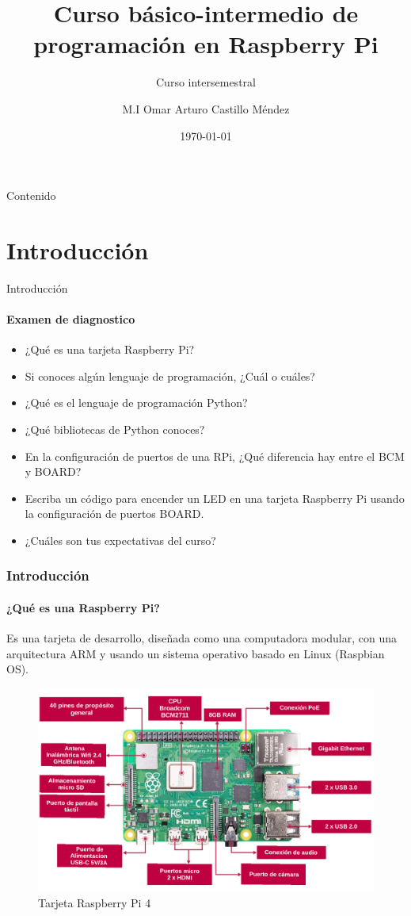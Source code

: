 \documentclass{beamer}
\title{Curso básico-intermedio de programación en Raspberry Pi}
\subtitle{Curso intersemestral}
\date{\today}
\author[OACM]{M.I Omar Arturo Castillo Méndez}
\begin{document}
	
	\begin{frame}[plain]
		\titlepage
	\end{frame}
	
	\begin{frame}{Contenido}
		\tableofcontents
	\end{frame}
	
	\section{Introducción}
	
	\begin{frame}{Introducción}
		\framesubtitle{Examen de diagnostico}
		\begin{itemize}
			\item ¿Qué es una tarjeta Raspberry Pi?
			\item Si conoces algún lenguaje de programación, ¿Cuál o cuáles?
			\item ¿Qué es el lenguaje de programación Python?
			\item ¿Qué bibliotecas de Python conoces?
			\item En la configuración de puertos de una RPi, ¿Qué diferencia hay entre el BCM y BOARD?
			\item Escriba un código para encender un LED en una tarjeta Raspberry Pi usando la configuración de puertos BOARD.
			\item ¿Cuáles son tus expectativas del curso?
		\end{itemize}
	\end{frame}
	
	\begin{frame}
		\frametitle{Introducción}
		\framesubtitle{¿Qué es una Raspberry Pi?}
		Es una tarjeta de desarrollo, diseñada como una computadora modular, con una arquitectura ARM y usando un sistema operativo basado en Linux (Raspbian OS).
		\begin{figure}
			\includegraphics[scale=0.4]{rpiboard}
			\caption{Tarjeta Raspberry Pi 4}
		\end{figure}
		
	\end{frame}	
\end{document}
